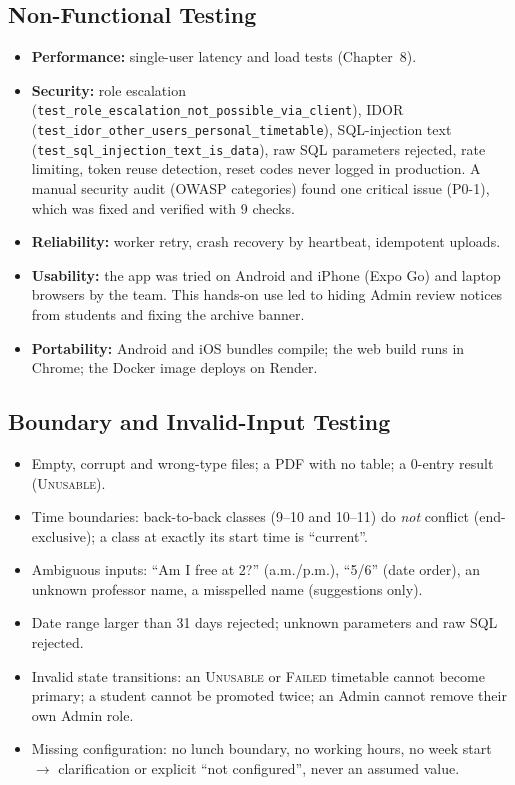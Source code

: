 \subsection{Non-Functional Testing}
\begin{itemize}
\item \textbf{Performance:} single-user latency and load tests (Chapter~8).
\item \textbf{Security:} role escalation (\texttt{test\_role\_escalation\_not\_possible\_via\_client}),
      IDOR (\texttt{test\_idor\_other\_users\_personal\_timetable}), SQL-injection text
      (\texttt{test\_sql\_injection\_text\_is\_data}), raw SQL parameters rejected, rate limiting,
      token reuse detection, reset codes never logged in production. A manual security audit (OWASP
      categories) found one critical issue (P0-1), which was fixed and verified with 9 checks.
\item \textbf{Reliability:} worker retry, crash recovery by heartbeat, idempotent uploads.
\item \textbf{Usability:} the app was tried on Android and iPhone (Expo Go) and laptop browsers by the
      team. This hands-on use led to hiding Admin review notices from students and fixing the
      archive banner.
\item \textbf{Portability:} Android and iOS bundles compile; the web build runs in Chrome; the Docker
      image deploys on Render.
\end{itemize}

\subsection{Boundary and Invalid-Input Testing}
\begin{itemize}
\item Empty, corrupt and wrong-type files; a PDF with no table; a 0-entry result (\textsc{Unusable}).
\item Time boundaries: back-to-back classes (9--10 and 10--11) do \emph{not} conflict (end-exclusive);
      a class at exactly its start time is ``current''.
\item Ambiguous inputs: ``Am I free at 2?'' (a.m./p.m.), ``5/6'' (date order), an unknown professor
      name, a misspelled name (suggestions only).
\item Date range larger than 31 days rejected; unknown parameters and raw SQL rejected.
\item Invalid state transitions: an \textsc{Unusable} or \textsc{Failed} timetable cannot become
      primary; a student cannot be promoted twice; an Admin cannot remove their own Admin role.
\item Missing configuration: no lunch boundary, no working hours, no week start $\rightarrow$
      clarification or explicit ``not configured'', never an assumed value.
\end{itemize}

